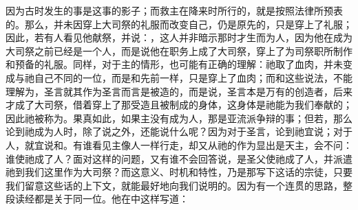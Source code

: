 因为古时发生的事是这事的影子；而救主在降来时所行的，就是按照法律所预表的。那么，并未因穿上大司祭的礼服而改变自己，仍是原先的，只是穿上了礼服；因此，若有人看见他献祭，并说：，这人并非暗示那时才生而为人，因为他在成为大司祭之前已经是一个人，而是说他在职务上成了大司祭，穿上了为司祭职所制作和预备的礼服。同样，对于主的情形，也可能有正确的理解：祂取了血肉，并未变成与祂自己不同的一位，而是和先前一样，只是穿上了血肉；而和这些说法，不能理解为，圣言就其作为圣言而言是被造的，而是说，圣言本是万有的创造者，后来才成了大司祭，借着穿上了那受造且被制成的身体，这身体是祂能为我们奉献的；因此祂被称为。果真如此，如果主没有成为人，那是亚流派争辩的事；但若，那么论到祂成为人时，除了说之外，还能说什么呢？因为对于圣言，论到祂宜说；对于人，就宜说和。有谁看见主像人一样行走，却又从祂的作为显出是天主，会不问：谁使祂成了人？面对这样的问题，又有谁不会回答说，是圣父使祂成了人，并派遣祂到我们这里作为大司祭？而这意义、时机和特性，乃是那写下这话的宗徒，只要我们留意这些话的上下文，就能最好地向我们说明的。因为有一个连贯的思路，整段读经都是关于同一位。他在中这样写道：\par

